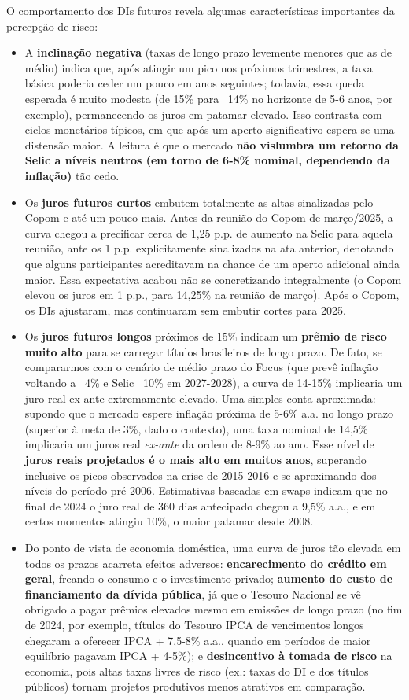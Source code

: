 \documentclass[a4paper,12pt]{article}
\begin{document}
O comportamento dos DIs futuros revela algumas características importantes da percepção de risco:
\begin{itemize}
    \item A \textbf{inclinação negativa} (taxas de longo prazo levemente menores que as de médio) indica que, após atingir um pico nos próximos trimestres, a taxa básica poderia ceder um pouco em anos seguintes; todavia, essa queda esperada é muito modesta (de 15\% para ~14\% no horizonte de 5-6 anos, por exemplo), permanecendo os juros em patamar elevado. Isso contrasta com ciclos monetários típicos, em que após um aperto significativo espera-se uma distensão maior. A leitura é que o mercado \textbf{não vislumbra um retorno da Selic a níveis neutros (em torno de 6-8\% nominal, dependendo da inflação)} tão cedo.
    \item Os \textbf{juros futuros curtos} embutem totalmente as altas sinalizadas pelo Copom e até um pouco mais. Antes da reunião do Copom de março/2025, a curva chegou a precificar cerca de 1,25 p.p. de aumento na Selic para aquela reunião, ante os 1 p.p. explicitamente sinalizados na ata anterior, denotando que alguns participantes acreditavam na chance de um aperto adicional ainda maior. Essa expectativa acabou não se concretizando integralmente (o Copom elevou os juros em 1 p.p., para 14,25\% na reunião de março). Após o Copom, os DIs ajustaram, mas continuaram sem embutir cortes para 2025.
    \item Os \textbf{juros futuros longos} próximos de 15\% indicam um \textbf{prêmio de risco muito alto} para se carregar títulos brasileiros de longo prazo. De fato, se compararmos com o cenário de médio prazo do Focus (que prevê inflação voltando a ~4\% e Selic ~10\% em 2027-2028), a curva de 14-15\% implicaria um juro real ex-ante extremamente elevado. Uma simples conta aproximada: supondo que o mercado espere inflação próxima de 5-6\% a.a. no longo prazo (superior à meta de 3\%, dado o contexto), uma taxa nominal de 14,5\% implicaria um juros real \emph{ex-ante} da ordem de 8-9\% ao ano. Esse nível de \textbf{juros reais projetados é o mais alto em muitos anos}, superando inclusive os picos observados na crise de 2015-2016 e se aproximando dos níveis do período pré-2006. Estimativas baseadas em swaps indicam que no final de 2024 o juro real de 360 dias antecipado chegou a 9,5\% a.a., e em certos momentos atingiu 10\%, o maior patamar desde 2008.
    \item Do ponto de vista de economia doméstica, uma curva de juros tão elevada em todos os prazos acarreta efeitos adversos: \textbf{encarecimento do crédito em geral}, freando o consumo e o investimento privado; \textbf{aumento do custo de financiamento da dívida pública}, já que o Tesouro Nacional se vê obrigado a pagar prêmios elevados mesmo em emissões de longo prazo (no fim de 2024, por exemplo, títulos do Tesouro IPCA de vencimentos longos chegaram a oferecer IPCA + 7,5-8\% a.a., quando em períodos de maior equilíbrio pagavam IPCA + 4-5\%); e \textbf{desincentivo à tomada de risco} na economia, pois altas taxas livres de risco (ex.: taxas do DI e dos títulos públicos) tornam projetos produtivos menos atrativos em comparação.
\end{itemize}
\end{document}
